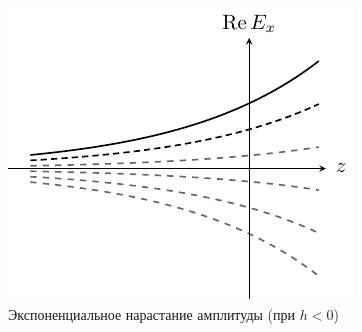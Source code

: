 \documentclass[a4paper,14pt]{extarticle}
\renewcommand{\epsilon}{\varepsilon}
\renewcommand{\kappa}{\varkappa}
\begin{document}
\begin{figure}[h!]
	\centering
	\includegraphics[scale=1]{img/lect3_ris3}
	\caption{Экспоненциальное нарастание амплитуды (при $h<0$)}
	\label{fig:lect3:3}
\end{figure}
%
%
%
%
%
%
%
%
\end{document}
